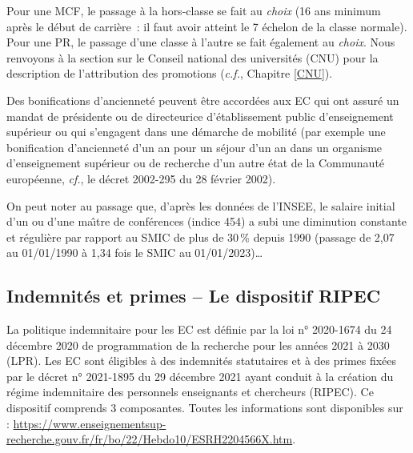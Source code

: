 Pour un\mp e MCF, le passage \`a la hors-classe se fait au {\em choix} (16 ans minimum
apr\`es le d\'ebut de carri\`ere~: il faut avoir atteint le
7\ieme{} \'echelon de la classe normale).
Pour un\mp e PR, le passage d'une classe \`a l'autre se fait \'egalement au {\em choix}.
Nous renvoyons \`a la section sur le Conseil national des universit\'es (CNU) pour la
description de l'attribution des promotions (\textit{c.f.}, Chapitre \ref{CNU}).

Des bonifications d'anciennet\'e peuvent \^etre accord\'ees aux EC
qui ont assur\'e un mandat de pr\'esident\mp e
ou de directeur\mp ice d'\'etablissement public d'enseignement sup\'erieur
ou qui s'engagent dans une d\'emarche de
mobilit\'e (par exemple une bonification d'anciennet\'e d'un an
pour un s\'ejour d'un an dans un organisme d'enseignement sup\'erieur
ou de recherche d'un autre \'etat de la Communaut\'e europ\'eenne,
{\em cf.}, le d\'ecret 2002-295 du 28 f\'evrier 2002).


On peut noter au passage que, d'apr\`es les donn\'ees de l'INSEE, le salaire initial d'un ou d'une ma\^\i tre de
conf\'erences (indice 454) a subi une diminution constante et r\'eguli\`ere
par rapport au SMIC de plus de 30\,\% depuis 1990 (passage de 2,07 au 01/01/1990 \`a 1,34 fois le SMIC au 01/01/2023)\ldots


\subsection{Indemnit\'es et primes -- Le dispositif RIPEC}

La politique indemnitaire pour les EC est d\'efinie par la loi n° 2020-1674 du 24 d\'ecembre 2020 de programmation de la recherche pour les ann\'ees 2021 \`a 2030 (LPR). Les EC sont \'eligibles \`a des indemnit\'es statutaires et \`a des primes fix\'ees par le d\'ecret n° 2021-1895 du 29 d\'ecembre 2021 ayant conduit \`a la cr\'eation du r\'egime indemnitaire des personnels enseignants et chercheurs (RIPEC). Ce dispositif comprends 3 composantes. Toutes les informations sont disponibles sur : \url{https://www.enseignementsup-recherche.gouv.fr/fr/bo/22/Hebdo10/ESRH2204566X.htm}.

